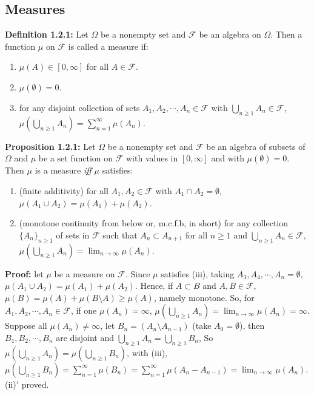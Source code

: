 \documentclass{article}
\newcommand{\mc}{\mathcal}
\begin{document}
\subsection{Measures}

\textbf{Definition 1.2.1: } Let \(\Omega\) be a nonempty set and \(\mc{F}\) be an algebra on \(\Omega\). Then a function
\(\mu\) on \(\mc{F}\) is called a measure if:

\begin{enumerate}[label=(\roman*)]
\item \(\mu(A)\in [0, \infty]\) for all \(A \in \mc{F}\).
\item \(\mu(\emptyset)=0\).
\item for any disjoint collection of sets \(A_1, A_2, \cdots, A_n \in \mc{F}\) with \(\bigcup_{n\geq 1}A_n\in \mc{F}\),
\(\mu(\bigcup_{n\geq 1}A_n)=\sum_{n=1}^{\infty}\mu(A_n)\).
\end{enumerate}

\vspace{2mm}
\textbf{Proposition 1.2.1: } Let \(\Omega\) be a nonempty set and \(\mc{F}\) be an algebra of subsets of \(\Omega\)
and \(\mu\) be a set function on \(\mc{F}\) with values in \([0, \infty]\) and with \(\mu(\emptyset)=0\).
Then \(\mu\) is a measure \textit{iff} \(\mu\) satisfies:

\begin{enumerate}[label=(\roman*)\('\)]
\item (finite additivity) for all \(A_1, A_2 \in \mc{F}\) with \(A_1\cap A_2 = \emptyset\), 
\(\mu(A_1\cup A_2)=\mu(A_1)+\mu(A_2)\).
\item (monotone continuity from below or, m.c.f.b, in short) for any collection \(\{A_n\}_{n\geq 1}\)
of sets in \(\mc{F}\) such that \(A_n\subset A_{n+1}\) for all \(n\geq 1\) and \(\bigcup_{n\geq 1}A_n\in \mc{F}\),
\(\mu(\bigcup_{n\geq 1}A_n)=\lim_{n\to \infty}\mu(A_n)\).
\end{enumerate}

\vspace{2mm}
\textbf{Proof: } let \(\mu\) be a measure on \(\mc{F}\). Since \(\mu\) satisfies (iii), taking
\(A_3, A_4, \cdots, A_n = \emptyset\), \(\mu(A_1\cup A_2)=\mu(A_1)+\mu(A_2)\). Hence, if
\(A\subset B\) and \(A, B \in \mc{F}\), \(\mu(B)=\mu(A) + \mu(B\setminus A)\geq \mu(A)\), namely monotone. 
So, for \(A_1, A_2, \cdots, A_n \in \mc{F}\), if one \(\mu(A_n)=\infty\), \(\mu(\bigcup_{n\geq 1}A_n)=\lim_{n\to \infty}\mu(A_n)
=\infty\). Suppose all \(\mu(A_n) \neq \infty\), let \(B_n=(A_n\setminus A_{n-1})\) (take \(A_0=\emptyset\)), then
\(B_1, B_2, \cdots, B_n\) are disjoint and \(\bigcup_{n\geq 1}A_n=\bigcup_{n\geq 1}B_n\),
So \(\mu(\bigcup_{n\geq 1}A_n)=\mu(\bigcup_{n\geq 1}B_n)\), with (iii), \(\mu(\bigcup_{n\geq 1}B_n)
=\sum_{n=1}^{\infty}\mu(B_n)=\sum_{n=1}^{\infty}\mu(A_n-A_{n-1})=\lim_{n\to \infty}\mu(A_n)\). (ii)\('\) proved.
\end{document}
